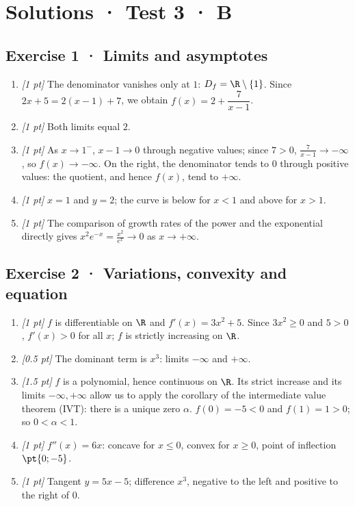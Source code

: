 \ifmxteacher\mxnewpage

\section*{Solutions · Test 3 · B}\label{cor:4-4}

\subsection*{Exercise 1 · Limits and asymptotes}\begin{enumerate}

\item \textit{[1 pt]} The denominator vanishes only at $1$: $D_f=\R\setminus\{1\}$. Since $2x+5=2(x-1)+7$, we obtain $f(x)=2+\dfrac{7}{x-1}$.

\item \textit{[1 pt]} Both limits equal $2$.

\item \textit{[1 pt]} As $x\to 1^-$, $x-1\to0$ through negative values; since $7>0$, $\frac{7}{x-1}\to-\infty$, so $f(x)\to-\infty$. On the right, the denominator tends to $0$ through positive values: the quotient, and hence $f(x)$, tend to $+\infty$.

\item \textit{[1 pt]} $x=1$ and $y=2$; the curve is below for $x<1$ and above for $x>1$.

\item \textit{[1 pt]} The comparison of growth rates of the power and the exponential directly gives $x^2e^{-x}=\frac{x^2}{e^x}\to0$ as $x\to+\infty$.

\end{enumerate}

\subsection*{Exercise 2 · Variations, convexity and equation}\begin{enumerate}

\item \textit{[1 pt]} $f$ is differentiable on $\R$ and $f'(x)=3x^2+5$. Since $3x^2\ge0$ and $5>0$, $f'(x)>0$ for all $x$; $f$ is strictly increasing on $\R$.

\item \textit{[0.5 pt]} The dominant term is $x^3$: limits $-\infty$ and $+\infty$.

\item \textit{[1.5 pt]} $f$ is a polynomial, hence continuous on $\R$. Its strict increase and its limits $-\infty,+\infty$ allow us to apply the corollary of the intermediate value theorem (IVT): there is a unique zero $\alpha$. $f(0)=-5<0$ and $f(1)=1>0$; so $0<\alpha<1$.

\item \textit{[1 pt]} $f''(x)=6x$: concave for $x\le0$, convex for $x\ge0$, point of inflection $\pt{0;-5}$.

\item \textit{[1 pt]} Tangent $y=5x-5$; difference $x^3$, negative to the left and positive to the right of $0$.

\end{enumerate}

